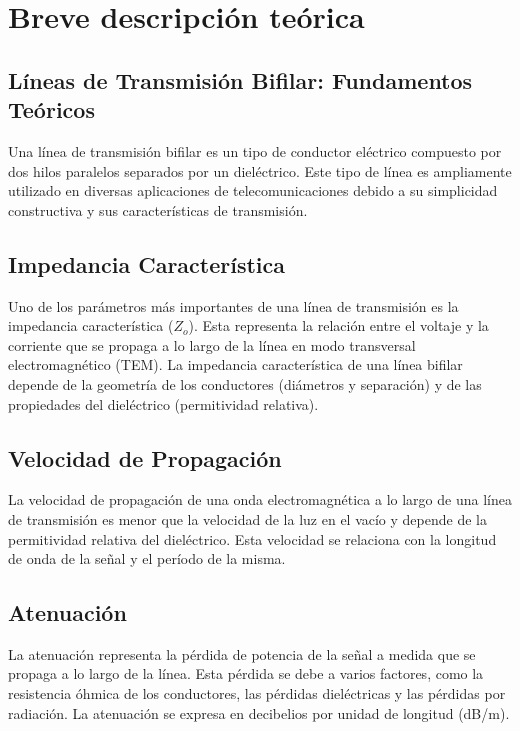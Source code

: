 \section{Breve descripción teórica}

\subsection{Líneas de Transmisión Bifilar: Fundamentos Teóricos}

Una línea de transmisión bifilar es un tipo de conductor eléctrico compuesto por dos hilos paralelos separados por un dieléctrico. Este tipo de línea es ampliamente utilizado en diversas aplicaciones de telecomunicaciones debido a su simplicidad constructiva y sus características de transmisión.

\subsection{Impedancia Característica}

Uno de los parámetros más importantes de una línea de transmisión es la impedancia característica ($Z_o$). Esta representa la relación entre el voltaje y la corriente que se propaga a lo largo de la línea en modo transversal electromagnético (TEM). La impedancia característica de una línea bifilar depende de la geometría de los conductores (diámetros y separación) y de las propiedades del dieléctrico (permitividad relativa).

\subsection{Velocidad de Propagación}

La velocidad de propagación de una onda electromagnética a lo largo de una línea de transmisión es menor que la velocidad de la luz en el vacío y depende de la permitividad relativa del dieléctrico. Esta velocidad se relaciona con la longitud de onda de la señal y el período de la misma.

\subsection{Atenuación}

La atenuación representa la pérdida de potencia de la señal a medida que se propaga a lo largo de la línea. Esta pérdida se debe a varios factores, como la resistencia óhmica de los conductores, las pérdidas dieléctricas y las pérdidas por radiación. La atenuación se expresa en decibelios por unidad de longitud (dB/m).

